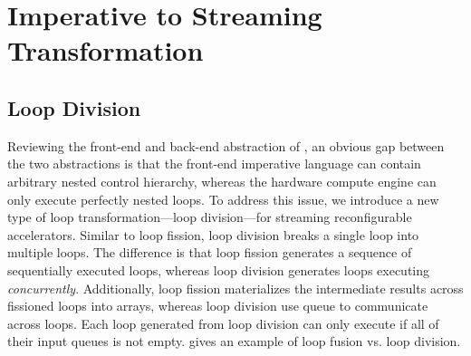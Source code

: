\section{Imperative to Streaming Transformation}
\label{sec:control}



\subsection{Loop Division}
Reviewing the front-end and back-end abstraction of \name, an obvious gap between the two
abstractions is that the front-end imperative language can contain arbitrary nested control hierarchy, whereas
the hardware compute engine can only execute perfectly nested loops.
To address this issue, we introduce a new type of loop transformation---loop division---for streaming reconfigurable
accelerators.
Similar to loop fission, loop division breaks a single loop into multiple loops.
The difference is that loop fission generates a sequence of sequentially executed loops, whereas
loop division generates loops executing \emph{concurrently}.
Additionally, loop fission materializes the intermediate results across fissioned loops into arrays,
whereas loop division use queue to communicate across loops.
Each loop generated from loop division can only execute if all of their input queues is not empty.
 gives an example of loop fusion vs. loop division.

